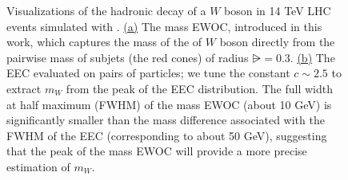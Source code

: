 \begin{figure}
{        \label{fig:m_ewoc:pp_to_ww:with_cartoon}
    }
    \hspace{10em}
    \caption[The mass EWOC and EEC calculated on the hadronic decay of a \(W\) boson in 14 TeV LHC events simulated with \pythia{}.]{
        Visualizations of the hadronic decay of a \(W\) boson in 14 TeV LHC events simulated with \pythia{}.
        \hyperref[fig:m_ewoc:pp_to_ww:with_cartoon]{(a)}
        The mass EWOC, introduced in this work, which captures the mass of the of \(W\) boson directly from the pairwise mass of subjets (the red cones) of radius \(\rsub=0.3\).
        \hyperref[fig:eec:pp_to_ww:with_cartoon]{(b)}
        The EEC evaluated on pairs of particles;
        we tune the constant \(c \sim 2.5\) to extract \(m_W\) from the peak of the EEC distribution.
        The full width at half maximum (FWHM) of the mass EWOC (about 10 GeV) is significantly smaller than the mass difference associated with the FWHM of the EEC (corresponding to about 50 GeV),
        suggesting that the peak of the mass EWOC will provide a more precise estimation of \(m_W\).
    }
    \label{fig:EWOCs:visualization}
\end{figure}




